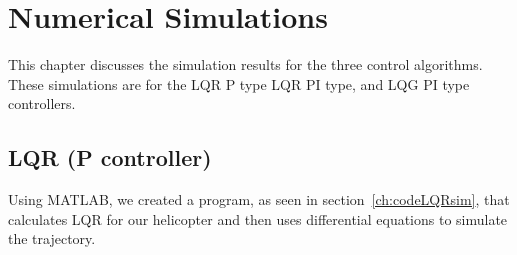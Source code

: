 \chapter{Numerical Simulations}
\label{ch: Chapter4}
This chapter discusses the simulation results for the three control algorithms.  These simulations are for the LQR P type LQR PI type, and LQG PI type controllers.
\section{LQR (P controller)}
Using MATLAB, we created a program, as seen in section~\ref{ch:codeLQRsim}, that calculates LQR for our helicopter and then uses differential equations to simulate the trajectory. 
